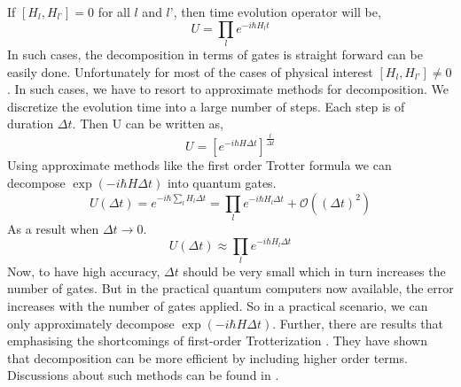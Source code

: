 \documentclass[12pt,a4paper]{report}
\begin{document}
If $[ H_{l}, H_{l’}] =0$ for all $l$ and $l’$, then time evolution operator will be,
\begin{equation}
U = \prod_{l} e^{-i \hbar H_{l} t} 
\end{equation}
In such cases, the decomposition in terms of gates is straight forward can be easily done. Unfortunately for most of the cases of physical interest $[ H_{l}, H_{l’}] \neq 0 $. 
In such cases, we have to resort to approximate methods for decomposition. We discretize the evolution time into a large number of steps. Each step is of duration $\Delta t$. Then U can be written as,
\begin{equation}
U = \left[e^{-i \hbar H\Delta t}\right]^{\frac{t}{\Delta t}}
\end{equation}
Using approximate methods like the first order Trotter formula we can decompose $\exp(-i\hbar H\Delta t)$ into quantum gates. 
\begin{equation}
U(\Delta t) = e^{-i\hbar\sum_{l} H_{l}\Delta t} = \prod_{l} e^{-i\hbar H_{l}\Delta t}+ \mathcal{O}((\Delta t)^{2})
\end{equation}
As a result when $\Delta t \rightarrow 0$.
\begin{equation}
U(\Delta t) \approx \prod_{l} e^{-i \hbar H_{l}\Delta t}
\end{equation}
Now, to have high accuracy, $\Delta t$ should be very small which in turn increases the number of gates. But in the practical quantum computers now available, the error increases with the number of gates applied. So in a practical scenario, we can only approximately decompose $\exp(-i\hbar H\Delta t)$. Further, there are results that emphasising the shortcomings of first-order Trotterization \cite{brown}\cite{clark}.  They have shown that decomposition can be more efficient by including higher order terms. Discussions about such methods can be found in \cite{nielsen}. 
\end{document}

